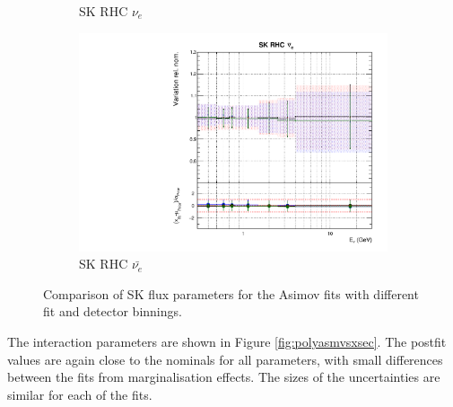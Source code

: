\begin{figure}
\begin{subfigure}{0.45\textwidth}
  \caption{SK RHC $\nu_{e}$}
\end{subfigure}
\begin{subfigure}{0.45\textwidth}
  \centering
  \includegraphics[width=0.75\linewidth]{figs/polyasmvsflux_15}
  \caption{SK RHC $\bar{\nu_e}$}
\end{subfigure}
\caption{Comparison of SK flux parameters for the Asimov fits with different fit and detector binnings.}
\label{fig:polyasmvsfluxSK}
\end{figure}

The interaction parameters are shown in Figure \ref{fig:polyasmvsxsec}. The postfit values are again close to the nominals for all parameters, with small differences between the fits from marginalisation effects. The sizes of the uncertainties are similar for each of the fits.

